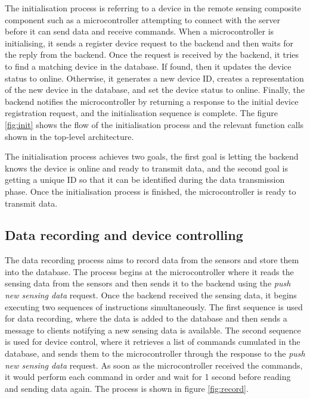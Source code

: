 \documentclass[../thesis.tex]{subfiles}
\begin{document}
The initialisation process is referring to a device in the remote sensing composite component such as a microcontroller attempting to connect with the server before it can send data and receive commands. When a microcontroller is initialising, it sends a register device request to the backend and then waits for the reply from the backend. Once the request is received by the backend, it tries to find a matching device in the database. If found, then it updates the device status to online. Otherwise, it generates a new device ID, creates a representation of the new device in the database, and set the device status to online. Finally, the backend notifies the microcontroller by returning a response to the initial device registration request, and the initialisation sequence is complete. The figure \ref{fig:init} shows the flow of the initialisation process and the relevant function calls shown in the top-level architecture.

The initialisation process achieves two goals, the first goal is letting the backend knows the device is online and ready to transmit data, and the second goal is getting a unique ID so that it can be identified during the data transmission phase. Once the initialisation process is finished, the microcontroller is ready to transmit data.


\subsection{Data recording and device controlling}

The data recording process aims to record data from the sensors and store them into the database. The process begins at the microcontroller where it reads the sensing data from the sensors and then sends it to the backend using the \emph{push new sensing data} request. Once the backend received the sensing data, it begins executing two sequences of instructions simultaneously. The first sequence is used for data recording, where the data is added to the database and then sends a message to clients notifying a new sensing data is available. The second sequence is used for device control, where it retrieves a list of commands cumulated in the database, and sends them to the microcontroller through the response to the \emph{push new sensing data} request. As soon as the microcontroller received the commands, it would perform each command in order and wait for 1 second before reading and sending data again. The process is shown in figure \ref{fig:record}.
\end{document}
